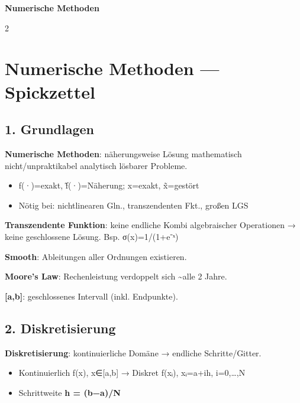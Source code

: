 \documentclass[10pt, a4paper]{article}
\providecommand{\nichttitle}{Formelsammlung}
\renewcommand{\nichttitle}{Numerische Methoden}
\begin{document}
\begin{center}
{\small\bfseries\color{accent}\nichttitle}
\end{center}
\vspace{-6pt}

\scriptsize
\begin{multicols}{2}


\section{Numerische Methoden — Spickzettel}


\subsection{1. Grundlagen}

\textbf{Numerische Methoden}: näherungsweise Lösung mathematisch nicht/unpraktikabel analytisch lösbarer Probleme.

\begin{itemize}
  \item f(·)=exakt, f̃(·)=Näherung; x=exakt, x̃=gestört
  \item Nötig bei: nichtlinearen Gln., transzendenten Fkt., großen LGS
\end{itemize}

\textbf{Transzendente Funktion}: keine endliche Kombi algebraischer Operationen → keine geschlossene Lösung. Bsp. σ(x)=1/(1+e⁻ˣ)

\textbf{Smooth}: Ableitungen aller Ordnungen existieren.

\textbf{Moore's Law}: Rechenleistung verdoppelt sich \textasciitilde{}alle 2 Jahre.

\textbf{[a,b]}: geschlossenes Intervall (inkl. Endpunkte).



\subsection{2. Diskretisierung}

\textbf{Diskretisierung}: kontinuierliche Domäne → endliche Schritte/Gitter.

\begin{itemize}
  \item Kontinuierlich f(x), x∈[a,b] → Diskret f(xᵢ), xᵢ=a+ih, i=0,…,N
  \item Schrittweite \textbf{h = (b−a)/N}
\end{itemize}



\end{multicols}
\end{document}
